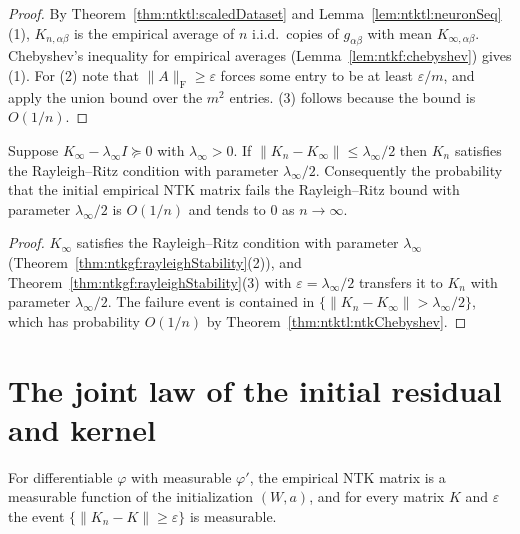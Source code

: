 \begin{proof}
  \leanok
By Theorem~\ref{thm:ntktl:scaledDataset} and Lemma~\ref{lem:ntktl:neuronSeq}(1), $K_{n,\alpha\beta}$ is the empirical average of $n$ i.i.d.\ copies of $g_{\alpha\beta}$ with mean $K_{\infty,\alpha\beta}$. Chebyshev's inequality for empirical averages (Lemma~\ref{lem:ntkf:chebyshev}) gives (1).
For (2) note that $\|A\|_{\mathrm F}\ge\varepsilon$ forces some entry to be at least $\varepsilon/m$, and apply the union bound over the $m^2$ entries. (3) follows because the bound is $O(1/n)$.
\end{proof}

\begin{theorem}\label{thm:ntktl:spectralGapInit}
  \leanok
Suppose $K_\infty-\lambda_\infty I\succeq0$ with $\lambda_\infty>0$. If $\|K_n-K_\infty\|\le\lambda_\infty/2$ then $K_n$ satisfies the Rayleigh--Ritz condition with parameter $\lambda_\infty/2$. Consequently the probability that the initial empirical NTK matrix fails the Rayleigh--Ritz bound with parameter
$\lambda_\infty/2$ is $O(1/n)$ and tends to $0$ as $n\to\infty$.
\end{theorem}

\begin{proof}
  \leanok
$K_\infty$ satisfies the Rayleigh--Ritz condition with parameter $\lambda_\infty$ (Theorem~\ref{thm:ntkgf:rayleighStability}(2)), and Theorem~\ref{thm:ntkgf:rayleighStability}(3) with $\varepsilon=\lambda_\infty/2$ transfers it to $K_n$ with parameter $\lambda_\infty/2$. The failure event is contained in $\{\|K_n-K_\infty\|>\lambda_\infty/2\}$, which has probability $O(1/n)$ by Theorem~\ref{thm:ntktl:ntkChebyshev}.
\end{proof}


\section{The joint law of the initial residual and kernel}\label{sec:ntktl:jointInit}

\begin{lemma}[Measurability]\label{lem:ntktl:measurability}
  \leanok
For differentiable $\varphi$ with measurable $\varphi'$, the empirical NTK matrix is a measurable function of the initialization $(W,a)$, and for every matrix $K$ and $\varepsilon$ the event $\{\|K_n-K\|\ge\varepsilon\}$ is measurable.
\end{lemma}

